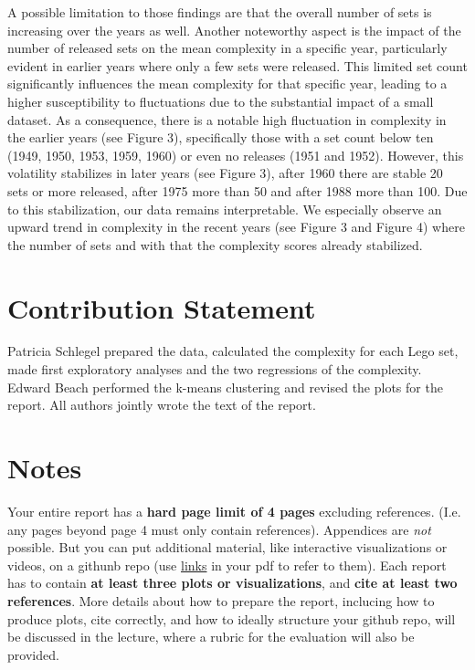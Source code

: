 \documentclass{article}
\theoremstyle{plain}
\theoremstyle{definition}
\theoremstyle{remark}
\begin{document}
A possible limitation to those findings are that the overall number of sets is increasing over the years as well. Another noteworthy aspect is the impact of the number of released sets on the mean complexity in a specific year, particularly evident in earlier years where only a few sets were released. This limited set count significantly influences the mean complexity for that specific year, leading to a higher susceptibility to fluctuations due to the substantial impact of a small dataset. As a consequence, there is a notable high fluctuation in complexity in the earlier years (see Figure 3), specifically those with a set count below ten (1949, 1950, 1953, 1959, 1960) or even no releases (1951 and 1952). However, this volatility stabilizes in later years (see Figure 3), after 1960 there are stable 20 sets or more released, after 1975 more than 50 and after 1988 more than 100. Due to this stabilization, our data remains interpretable. We especially observe an upward trend in complexity in the recent years (see Figure 3 and Figure 4) where the number of sets and with that the complexity scores already stabilized. 

\section*{Contribution Statement}

Patricia Schlegel prepared the data, calculated the complexity for each Lego set, made first exploratory analyses and the two regressions of the complexity. Edward Beach performed the k-means clustering and revised the plots for the report. All authors jointly wrote the text of the report.

\section*{Notes} 

Your entire report has a \textbf{hard page limit of 4 pages} excluding references. (I.e. any pages beyond page 4 must only contain references). Appendices are \emph{not} possible. But you can put additional material, like interactive visualizations or videos, on a githunb repo (use \href{https://github.com/pnkraemer/tueplots}{links} in your pdf to refer to them). Each report has to contain \textbf{at least three plots or visualizations}, and \textbf{cite at least two references}. More details about how to prepare the report, inclucing how to produce plots, cite correctly, and how to ideally structure your github repo, will be discussed in the lecture, where a rubric for the evaluation will also be provided.




\end{document}
